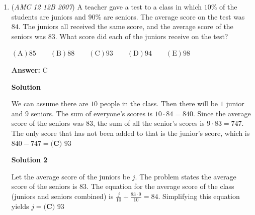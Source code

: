 \begin{enumerate}
 $\mathrm {(A)} 125\qquad \mathrm {(B)} 144\qquad \mathrm {(C)} 153\qquad \mathrm {(D)} 173\qquad \mathrm {(E)} 180$

 \textbf{Answer: }D



\textbf{Solution}

The sum of the interior angles of any quadrilateral is $360^\circ.$
 \begin{align*} 360 &= \angle A + \angle B + \angle C + \angle D\\ &= \angle A + \frac{1}{2}A + \frac{1}{3}A + \frac{1}{4}A\\ &= \frac{12}{12}A + \frac{6}{12}A + \frac{4}{12}A + \frac{3}{12}A\\ &= \frac{25}{12}A \end{align*}

 \[\angle A = 360 \cdot \frac{12}{25} = 172.8 \approx \boxed{\mathrm{(D) \ } 173}\]



	\item (\textit{AMC 12 12B 2007}) A teacher gave a test to a class in which $10\%$ of the students are juniors and $90\%$ are seniors. The average score on the test was $84$. The juniors all received the same score, and the average score of the seniors was $83$. What score did each of the juniors receive on the test?


 $\mathrm {(A)} 85\qquad \mathrm {(B)} 88\qquad \mathrm {(C)} 93\qquad \mathrm {(D)} 94\qquad \mathrm {(E)} 98$

 \textbf{Answer: }C



\textbf{Solution}

We can assume there are $10$ people in the class. Then there will be $1$ junior and $9$ seniors. The sum of everyone's scores is $10 \cdot 84 = 840$. Since the average score of the seniors was $83$, the sum of all the senior's scores is $9 \cdot 83 = 747$. The only score that has not been added to that is the junior's score, which is $840 - 747 = \boxed{\textbf{(C) } 93}$




\textbf{Solution 2}

Let the average score of the juniors be $j$. The problem states the average score of the seniors is $83$. The equation for the average score of the class (juniors and seniors combined) is $\frac{j}{10} + \frac{83 \cdot 9}{10} = 84$. Simplifying this equation yields $j = \boxed{\textbf{(C) } 93}$




\end{enumerate}
